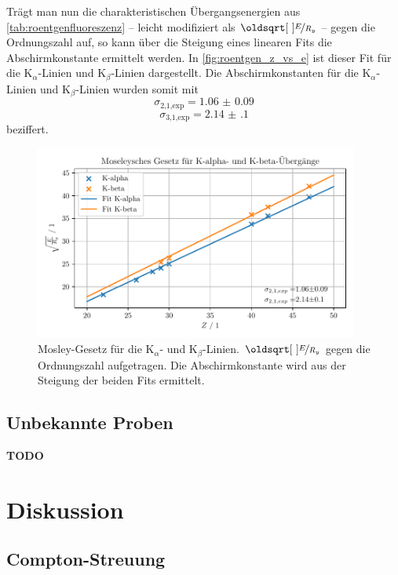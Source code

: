 \documentclass[ngerman]{scrartcl}
\begin{document}
%
Trägt man nun die charakteristischen Übergangsenergien aus \autoref{tab:roentgenfluoreszenz} -- leicht modifiziert als $\sqrt{\nicefrac{E}{R_y}}$ -- gegen die Ordnungszahl auf, so kann über die Steigung eines linearen Fits die Abschirmkonstante ermittelt werden. In \autoref{fig:roentgen_z_vs_e} ist dieser Fit für die K$_{\alpha}$-Linien und K$_{\beta}$-Linien dargestellt. Die Abschirmkonstanten für die K$_{\alpha}$-Linien und K$_{\beta}$-Linien wurden somit mit
\[\sigma_{\text{2,1,exp}} = \num{1.06(9)} \]
\[\sigma_{\text{3,1,exp}} = \num{2.14(10)}\]
beziffert.
%
\begin{figure}[H]
    \centering
    \begin{samepage}
        \includegraphics[width=0.95\textwidth]{../plots/roentgen_data_Z_vs_E.pdf}
        \caption[Mosley-Gesetz für die K$_{\alpha}$- und K$_{\beta}$-Linien.]{Mosley-Gesetz für die K$_{\alpha}$- und K$_{\beta}$-Linien. $\sqrt{\nicefrac{E}{R_y}}$ gegen die Ordnungszahl aufgetragen. Die Abschirmkonstante wird aus der Steigung der beiden Fits ermittelt.}
        \label{fig:roentgen_z_vs_e}
    \end{samepage}
\end{figure}


\subsection{Unbekannte Proben}
\label{sec:roentgen_unbekannt}

\textbf{TODO}



\section{Diskussion}
\label{sec:diskussion}

\subsection{Compton-Streuung}
\label{sec:diskussion_compton}
\end{document}

